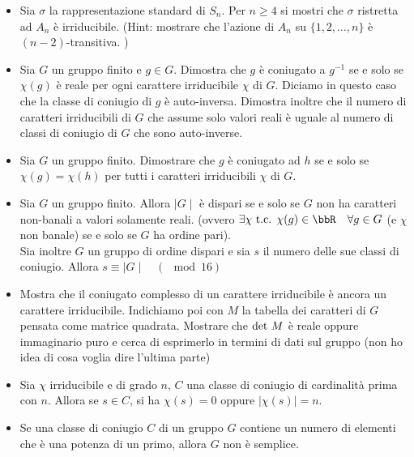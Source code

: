 \documentclass[a4paper,NoNotes,GeneralMath]{stdmdoc}
\begin{document}
\begin{itemize}
		\item Sia $\sigma$ la rappresentazione standard di $S_n$. Per $n \ge 4$ si mostri che $\sigma$ ristretta ad $A_n$ è irriducibile. (Hint: mostrare che l'azione di $A_n$ su $\{ 1, 2, \ldots, n\}$ è $(n-2)$-transitiva. )

		\item Sia $G$ un gruppo finito e $g \in G$. Dimostra che $g$ è coniugato a $g^{-1}$ se e solo se $\chi(g)$ è reale per ogni carattere irriducibile $\chi$ di $G$. Diciamo in questo caso che la classe di coniugio di $g$ è auto-inversa. Dimostra inoltre che il numero di caratteri irriducibili di $G$ che assume solo valori reali è uguale al numero di classi di coniugio di $G$ che sono auto-inverse.

		\item Sia $G$ un gruppo finito. Dimostrare che $g$ è coniugato ad $h$ se e solo se $\chi(g) = \chi(h)$ per tutti i caratteri irriducibili $\chi$ di $G$.

		\item Sia $G$ un gruppo finito. Allora $\mid G \mid$ è dispari se e solo se $G$ non ha caratteri non-banali a valori solamente reali. (ovvero $\exists \chi \tc \chi(g) \in \bbR \quad \forall g \in G$ (e $\chi$ non banale) se e solo se $G$ ha ordine pari). \\
		Sia inoltre $G$ un gruppo di ordine dispari e sia $s$ il numero delle sue classi di coniugio. Allora $s \equiv \mid G \mid \quad (\mod 16)$

		\item Mostra che il coniugato complesso di un carattere irriducibile è ancora un carattere irriducibile. Indichiamo poi con $M$ la tabella dei caratteri di $G$ pensata come matrice quadrata. Mostrare che $\mbox{det } M$ è reale oppure immaginario puro e cerca di esprimerlo in termini di dati sul gruppo (non ho idea di cosa voglia dire l'ultima parte)

		\item Sia $\chi$ irriducibile e di grado $n$, $C$ una classe di coniugio di cardinalità prima con $n$. Allora se $s \in C$, si ha $\chi (s) = 0$ oppure $\mid \chi(s) \mid = n$.
		
		\item Se una classe di coniugio $C$ di un gruppo $G$ contiene un numero di elementi che è una potenza di un primo, allora $G$ non è semplice.


\end{itemize}
\end{document}
